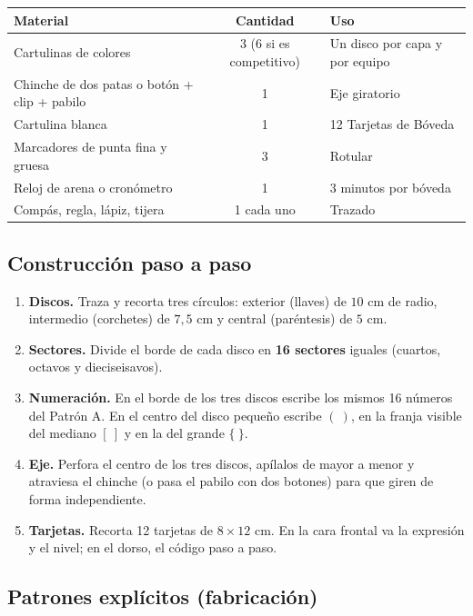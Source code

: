 \documentclass[12pt, letterpaper]{article}
\begin{document}
\begin{center}
\small
\begin{tabular}{@{}p{5.0cm} c p{7.4cm}@{}}
\toprule
\textbf{Material} & \textbf{Cantidad} & \textbf{Uso}\\
\midrule
Cartulinas de colores & 3 (6 si es competitivo) & Un disco por capa y por equipo\\
Chinche de dos patas o botón + clip + pabilo & 1 & Eje giratorio\\
Cartulina blanca & 1 & 12 Tarjetas de Bóveda\\
Marcadores de punta fina y gruesa & 3 & Rotular\\
Reloj de arena o cronómetro & 1 & 3 minutos por bóveda\\
Compás, regla, lápiz, tijera & 1 cada uno & Trazado\\
\bottomrule
\end{tabular}
\end{center}

\subsection{Construcción paso a paso}

\begin{enumerate}[leftmargin=*]
  \item \textbf{Discos.} Traza y recorta tres círculos: exterior (llaves) de $10$ cm de radio, intermedio (corchetes) de $7{,}5$ cm y central (paréntesis) de $5$ cm.
  \item \textbf{Sectores.} Divide el borde de cada disco en \textbf{16 sectores} iguales (cuartos, octavos y dieciseisavos).
  \item \textbf{Numeración.} En el borde de los tres discos escribe los mismos 16 números del Patrón A. En el centro del disco pequeño escribe $(~)$, en la franja visible del mediano $[~]$ y en la del grande $\{~\}$.
  \item \textbf{Eje.} Perfora el centro de los tres discos, apílalos de mayor a menor y atraviesa el chinche (o pasa el pabilo con dos botones) para que giren de forma independiente.
  \item \textbf{Tarjetas.} Recorta 12 tarjetas de $8\times 12$ cm. En la cara frontal va la expresión y el nivel; en el dorso, el código paso a paso.
\end{enumerate}

\subsection{Patrones explícitos (fabricación)}
\end{document}

